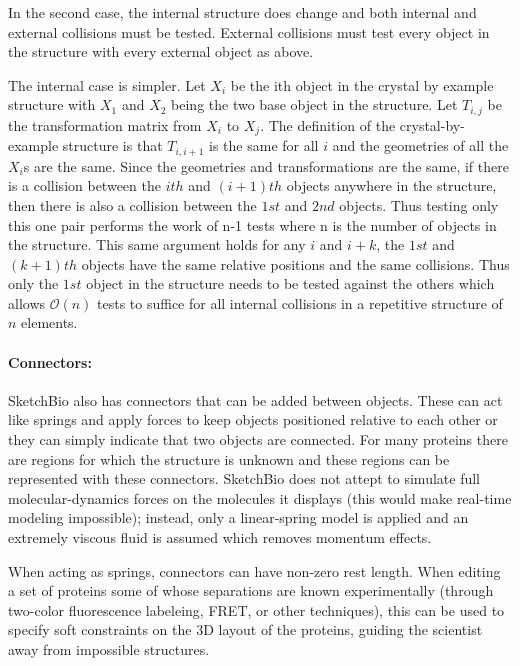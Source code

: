\documentclass[twocolumn]{bmcart}%
\begin{document}
In the second case, the internal structure does change and both internal and external collisions must be tested.  External collisions must test every object in the structure with every external object as above.

The internal case is simpler.  Let $X_i$ be the ith object in the crystal by example structure with $X_1$ and $X_2$ being the two base object in the structure.  Let $T_{i,j}$ be the transformation matrix from $X_i$ to $X_j$.  The definition of the crystal-by-example structure is that $T_{i,i+1}$ is the same for all $i$ and the geometries of all the $X_i$s are the same.  Since the geometries and transformations are the same, if there is a collision between the $ith$ and $(i+1)th$ objects anywhere in the structure, then there is also a collision between the $1st$ and $2nd$ objects.  Thus testing only this one pair performs the work of n-1 tests where n is the number of objects in the structure.  This same argument holds for any $i$ and $i+k$, the $1st$ and $(k+1)th$ objects have the same relative positions and the same collisions.  Thus only the $1st$ object in the structure needs to be tested against the others which allows $\mathcal{O}(n)$ tests to suffice for all internal collisions in a repetitive structure of $n$ elements.


\paragraph*{Connectors:}
SketchBio also has connectors that can be added between objects.  These can act like springs and apply forces to keep objects positioned relative to each other or they can simply indicate that two objects are connected.  For many proteins there are regions for which the structure is unknown and these regions can be represented with these connectors.  SketchBio does not attept to simulate full molecular-dynamics forces on the molecules it displays (this would make real-time modeling impossible); instead, only a linear-spring model is applied and an extremely viscous fluid is assumed which removes momentum effects.

When acting as springs, connectors can have non-zero rest length.  When editing a set of proteins some of whose separations are known experimentally (through two-color fluorescence labeleing, FRET, or other techniques), this can be used to specify soft constraints on the 3D layout of the proteins, guiding the scientist away from impossible structures.
\end{document}
